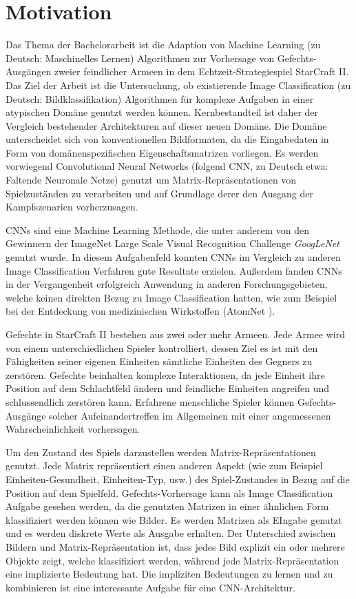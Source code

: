 \section{Motivation}

Das Thema der Bachelorarbeit ist die Adaption von Machine Learning (zu Deutsch: Maschinelles Lernen) Algorithmen zur Vorhersage von Gefechts-Ausgängen zweier feindlicher Armeen in dem Echtzeit-Strategiespiel StarCraft II. Das Ziel der Arbeit ist die Untersuchung, ob existierende Image Classification (zu Deutsch: Bildklassifikation) Algorithmen für komplexe Aufgaben in einer atypischen Domäne genutzt werden können. Kernbestandteil ist daher der Vergleich bestehender Architekturen auf dieser neuen Domäne. Die Domäne unterscheidet sich von konventionellen Bildformaten, da die Eingabedaten in Form von domänenspezifischen Eigenschaftsmatrizen vorliegen. Es werden vorwiegend Convolutional Neural Networks (folgend CNN, zu Deutsch etwa: Faltende Neuronale Netze) genutzt um Matrix-Repräsentationen von Spielzuständen zu verarbeiten und auf Grundlage derer den Ausgang der Kampfszenarien vorherzusagen. 

CNNs sind eine Machine Learning Methode, die unter anderem von den Gewinnern der ImageNet Large Scale Visual Recognition Challenge \textit{GoogLeNet} \parencite{DBLP:journals/corr/SzegedyLJSRAEVR14} genutzt wurde. In diesem Aufgabenfeld konnten CNNs im Vergleich zu anderen Image Classification Verfahren gute Resultate erzielen. Außerdem fanden CNNs in der Vergangenheit erfolgreich Anwendung in anderen Forschungsgebieten, welche keinen direkten Bezug zu Image Classification hatten, wie zum Beispiel bei der Entdeckung von medizinischen Wirkstoffen (AtomNet \parencite{DBLP:journals/corr/WallachDH15}).

Gefechte in StarCraft II bestehen aus zwei oder mehr Armeen. Jede Armee wird von einem unterschiedlichen Spieler kontrolliert, dessen Ziel es ist mit den Fähigkeiten seiner eigenen Einheiten sämtliche Einheiten des Gegners zu zerstören. Gefechte beinhalten komplexe Interaktionen, da jede Einheit ihre Position auf dem Schlachtfeld ändern und feindliche Einheiten angreifen und schlussendlich zerstören kann. Erfahrene menschliche Spieler können Gefechts-Ausgänge solcher Aufeinandertreffen im Allgemeinen mit einer angemessenen Wahrscheinlichkeit vorhersagen.

Um den Zustand des Spiels darzustellen werden Matrix-Repräsentationen genutzt. Jede Matrix repräsentiert einen anderen Aspekt (wie zum Beispiel Einheiten-Gesundheit, Einheiten-Typ, usw.) des Spiel-Zustandes in Bezug auf die Position auf dem Spielfeld. Gefechts-Vorhersage kann als Image Classification Aufgabe gesehen werden, da die genutzten Matrizen in einer ähnlichen Form klassifiziert werden können wie Bilder. Es werden Matrizen als EIngabe genutzt und es werden diskrete Werte als Ausgabe erhalten. Der Unterschied zwischen Bildern und Matrix-Repräsentation ist, dass jedes Bild explizit ein  oder mehrere Objekte zeigt, welche klassifiziert werden, während jede Matrix-Repräsentation eine implizierte Bedeutung hat. Die impliziten Bedeutungen zu lernen und zu kombinieren ist eine interessante Aufgabe für eine CNN-Architektur.

